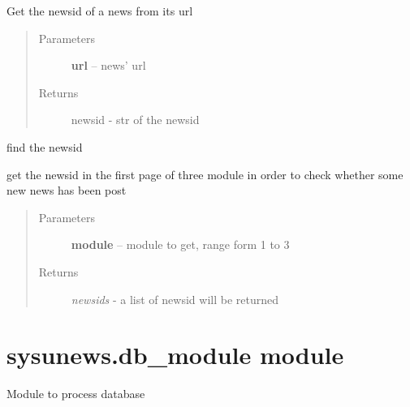 \documentclass[letterpaper,10pt,english]{sphinxmanual}
\begin{document}

\begin{fulllineitems}
\label{sysunews:sysunews.api.get_newsid}
Get the newsid of a news from its url
\begin{quote}\begin{description}
\item[{Parameters}] \leavevmode
\textbf{url} -- news' url

\item[{Returns}] \leavevmode
newsid - str of the newsid

\end{description}\end{quote}

\end{fulllineitems}


\begin{fulllineitems}
\label{sysunews:sysunews.api.get_newsid_firstpage}
find the newsid

get the newsid in the first page of three module 
in order to check whether some new news has been post
\begin{quote}\begin{description}
\item[{Parameters}] \leavevmode
\textbf{module} -- module to get, range form 1 to 3

\item[{Returns}] \leavevmode
\emph{newsids} - a list of newsid will be returned

\end{description}\end{quote}

\end{fulllineitems}



\section{sysunews.db\_module module}
\label{sysunews:sysunews-db-module-module}\label{sysunews:module-sysunews.db_module}
Module to process database
\end{document}
